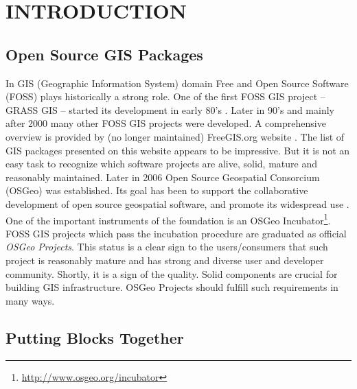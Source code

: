 \documentclass{isprs}
\begin{document}

\maketitle


\section{INTRODUCTION}\label{INTRODUCTION}

\sloppy

\subsection{Open Source GIS Packages}\label{sec:Open Source GIS Packages}

In GIS (Geographic Information System) domain Free and Open Source
Software (FOSS) plays historically a strong role. One of the first
FOSS GIS project -- GRASS GIS -- started its development in early 80's
\cite{neteler-metz-bowman-landa.2012:Elsevier}. Later in 90's and
mainly after 2000 many other FOSS GIS projects were developed. A
comprehensive overview is provided by (no longer maintained)
FreeGIS.org website \cite{freegis.org}. The list of GIS packages
presented on this website appears to be impressive. But it is not an
easy task to recognize which software projects are alive, solid,
mature and reasonably maintained. Later in 2006 Open Source Geospatial
Consorcium (OSGeo) was established. Its goal has been to support the
collaborative development of open source geospatial software, and
promote its widespread use \cite{osgeo.org}. One of the important
instruments of the foundation is an OSGeo
Incubator\footnote{\url{http://www.osgeo.org/incubator}}. FOSS GIS
projects which pass the incubation procedure are graduated as official
\textit{OSGeo Projects}. This status is a clear sign to the
users/consumers that such project is reasonably mature and has strong and
diverse user and developer community. Shortly, it is a sign of the
quality. Solid components are crucial for building GIS
infrastructure. OSGeo Projects should fulfill such requirements in
many ways.

\subsection{Putting Blocks Together}\label{sec:Putting blocks together}
\end{document}
